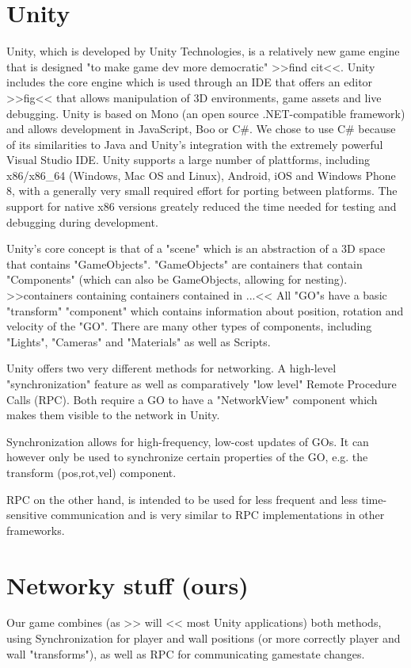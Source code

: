 \documentclass{report}
\begin{document}
\section{Unity}
Unity, which is developed by Unity Technologies, is a relatively new game engine that is designed "to make game dev more democratic" >>find cit<<.
Unity includes the core engine which is used through an IDE that offers an editor >>fig<< that allows manipulation of 3D environments, game assets and live debugging.
Unity is based on Mono (an open source .NET-compatible framework) and allows development in JavaScript, Boo or C\#. 
We chose to use C\# because of its similarities to Java and Unity's integration with the extremely powerful Visual Studio IDE.
Unity supports a large number of plattforms, including x86/x86\_64 (Windows, Mac OS and Linux), Android, iOS and Windows Phone 8, with a generally very small required effort for porting between platforms.
The support for native x86 versions greately reduced the time needed for testing and debugging during development.

Unity's core concept is that of a "scene" which is an abstraction of a 3D space that contains "GameObjects".
"GameObjects" are containers that contain "Components" (which can also be GameObjects, allowing for nesting).
>>containers containing containers contained in ...<<
All "GO"s have a basic "transform" "component" which contains information about position, rotation and velocity of the "GO". There are many other types of components, including "Lights", "Cameras" and "Materials" as well as Scripts.

Unity offers two very different methods for networking.
A high-level "synchronization" feature as well as comparatively "low level"  Remote Procedure Calls (RPC).
Both require a GO to have a "NetworkView" component which makes them visible to the network in Unity.

Synchronization allows for high-frequency, low-cost updates  of GOs. It can however only be used to synchronize certain properties of the GO, e.g. the transform (pos,rot,vel) component.

RPC on the other hand, is intended to be used for less frequent and less time-sensitive communication and is very similar to RPC implementations in other frameworks.

\section{Networky stuff (ours)}
Our game combines (as >> will << most Unity applications) both methods, using Synchronization for player and wall positions (or more correctly player and wall "transforms"), as well as RPC for communicating gamestate changes.
\end{document}
